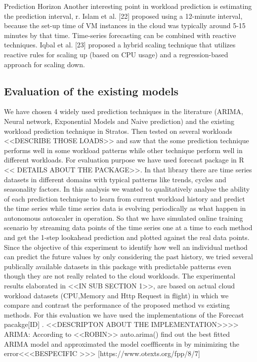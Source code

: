 Prediction Horizon
Another interesting point in workload prediction is estimating the prediction interval, r. Islam et al. [22] proposed using a 12-minute interval, because the set-up time of VM instances in the cloud was typically around 5-15 minutes by that time. Time-series forecasting can be combined with reactive techniques. Iqbal et al. [23] proposed a hybrid scaling technique that utilizes reactive rules for scaling up (based on CPU usage) and a regression-based approach for scaling down.

\subsection{Evaluation of the existing models}

We have chosen 4 widely used prediction techniques in the literature (ARIMA, Neural network, Exponential Models and Naive prediction) and the existing workload prediction technique in Stratos. Then tested on several workloads <<DESCRIBE THOSE LOADS>> and saw that the some prediction technique performs well in some workload patterns while other technique perform well in different workloads.
For evaluation purpose we have used forecast package in R << DETAILS ABOUT THE PACKAGE>>. In that library there are time series datasets in different domains with typical patterns like trends, cycles and seasonality factors. In this analysis we wanted to qualitatively analyse the ability of each prediction technique to learn from current workload history and predict the time series while time series data is evolving periodically as what happen in autonomous autoscaler in operation. So that we have simulated online training scenario by streaming data points of the time series one at a time to each method and get the 1-step lookahead prediction and plotted against the real data points. Since the objective of this experiment to identify  how well an individual method can predict the future values by only considering the past history, we tried several publically available datasets in this package with predictable patterns even though they are not really related to the cloud workloads. The experimental results elaborated in <<IN SUB SECTION 1>>, are based on actual cloud workload datasets (CPU,Memory and Http Request in flight)  in which we  compare and contrast the performance of the proposed method vs existing methods. 
For this evaluation we have used the implementations of the Forecast pacakge[ID] . <<DESCRIPTON ABOUT THE IMPLEMENTATION>>>>
ARIMA: According to <<ROBIN>> auto.arima()  find out the best fitted ARIMA model and approximated the model coeffficents in by minimizing the error<<<BESPECIFIC >>> [https://www.otexts.org/fpp/8/7]

